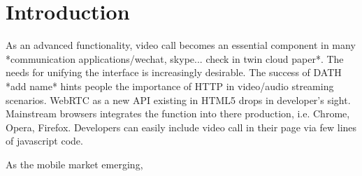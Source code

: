 \section{Introduction}

As an advanced functionality, video call becomes an essential
component in many *communication applications/wechat, skype... check
in twin cloud paper*. The needs for unifying the interface is
increasingly desirable. The success of DATH *add name* hints people
the importance of HTTP in video/audio streaming scenarios. WebRTC as a
new API existing in HTML5 drops in developer's sight. Mainstream
browsers integrates the function into there production, i.e. Chrome,
Opera, Firefox. Developers can easily include video call in their page
via few lines of javascript code.

As the mobile market emerging, 

